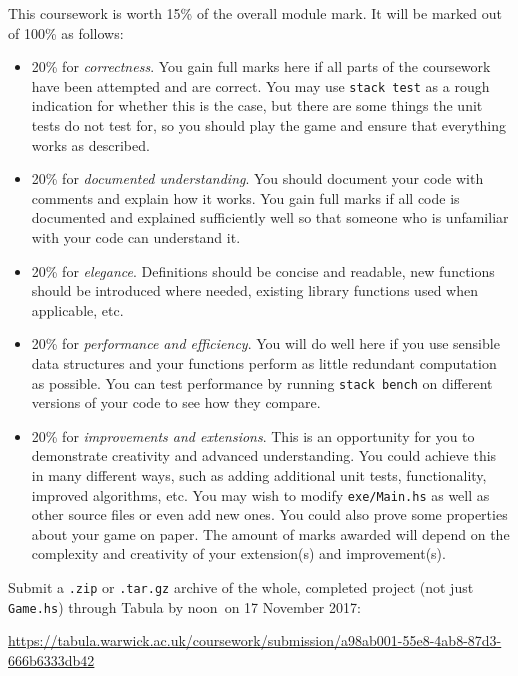 \documentclass{cs256-shared/cs256}
\newcommand{\deadlineTime}{noon}
\newcommand{\deadlineDate}{17 November 2017}
\newcommand{\submissionURL}{https://tabula.warwick.ac.uk/coursework/submission/a98ab001-55e8-4ab8-87d3-666b6333db42}
\begin{document}
This coursework is worth 15\% of the overall module mark. It will be marked out of 100\% as follows:
\begin{itemize}
\item 20\% for \emph{correctness}. You gain full marks here if all parts of the coursework have been attempted and are correct. You may use \texttt{stack test} as a rough indication for whether this is the case, but there are some things the unit tests do not test for, so you should play the game and ensure that everything works as described.
\item 20\% for \emph{documented understanding}. You should document your code with comments and explain how it works. You gain full marks if all code is documented and explained sufficiently well so that someone who is unfamiliar with your code can understand it.
\item 20\% for \emph{elegance}. Definitions should be concise and readable, new functions should be introduced where needed, existing library functions used when applicable, etc. 
\item 20\% for \emph{performance and efficiency}. You will do well here if you use sensible data structures and your functions perform as little redundant computation as possible. You can test performance by running \texttt{stack bench} on different versions of your code to see how they compare. 
\item 20\% for \emph{improvements and extensions}. This is an opportunity for you to demonstrate creativity and advanced understanding. You could achieve this in many different ways, such as adding additional unit tests, functionality, improved algorithms, etc. You may wish to modify \texttt{exe/Main.hs} as well as other source files or even add new ones. You could also prove some properties about your game on paper. The amount of marks awarded will depend on the complexity and creativity of your extension(s) and improvement(s).
\end{itemize}
Submit a \texttt{.zip} or \texttt{.tar.gz} archive of the whole, completed project (not just \texttt{Game.hs}) through Tabula by \deadlineTime\ on \deadlineDate:
\begin{center} 
	\url{\submissionURL}
\end{center}
\end{document}
